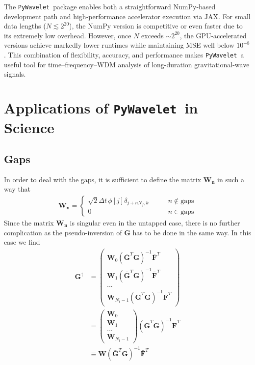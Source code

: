 \documentclass[%
 reprint,
superscriptaddress,
nofootinbib,
 amsmath,amssymb,
 aps,
colorlinks = true, 
linkcolor = blue, 
urlcolor = blue, 
citecolor = blue, 
anchorcolor = blue,
]{revtex4-2}
\newcommand{\package}{\texttt{PyWavelet}}
\begin{document}
The \package\ package enables both a straightforward NumPy‐based development path and high‐performance accelerator execution via JAX. 
For small data lengths ($N \lesssim 2^{20}$), the NumPy version is competitive or even faster due to its extremely low overhead. 
However, once $N$ exceeds $\sim 2^{20}$, the GPU‐accelerated versions achieve markedly lower runtimes while maintaining MSE well below $10^{-8}$. 
This combination of flexibility, accuracy, and performance makes \package\ a useful tool for time–frequency–WDM analysis of long-duration gravitational-wave signals.






\section{Applications of \package\ in Science}
\subsection{Gaps}

In order to deal with the gaps, it is sufficient to define the matrix $\mathbf{W_n}$ in such a way that
%
\begin{align}
\mathbf{W_n}=\begin{cases}
    \sqrt{2} \Delta t  \,\phi[j]\delta_{j+nN_f,k}&\qquad n\notin \text{gaps}\\
    0 &\qquad n\in \text{gaps}
\end{cases}
\end{align}
%
Since the matrix $\mathbf{W_n}$ is singular even in the untapped case, there is no further complication as the pseudo-inversion of $\mathbf{G}$ has to be done in the same way. In this case we find
%
\begin{align}
\mathbf{G}^\dagger&= \begin{pmatrix} \mathbf{W}_0\left(\bar{\mathbf{G}}^T\mathbf{G}\right)^{-1}\bar{\mathbf{F}}^T\\ \mathbf{W}_1\left(\bar{\mathbf{G}}^T\mathbf{G}\right)^{-1}\bar{\mathbf{F}}^T\\...\\ \mathbf{W}_{N_t-1}\left(\bar{\mathbf{G}}^T\mathbf{G}\right)^{-1}\bar{\mathbf{F}}^T
\end{pmatrix} \\ &=\begin{pmatrix} \mathbf{W}_0\\ \mathbf{W}_1\\...\\ \mathbf{W}_{N_t-1}
\end{pmatrix}\left(\bar{\mathbf{G}}^T\mathbf{G}\right)^{-1}\bar{\mathbf{F}}^T \\&\equiv\mathbf{W}\left(\bar{\mathbf{G}}^T\mathbf{G}\right)^{-1}\bar{\mathbf{F}}^T
\end{align}
%
\end{document}
